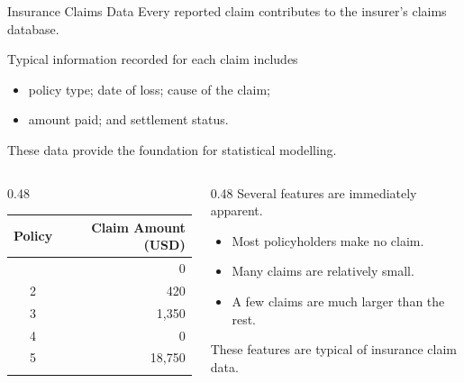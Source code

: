 \documentclass[
  ignorenonframetext,
  aspectratio=169,
]{beamer}
\newcounter{none} %
\providecommand{\tightlist}{%
  \setlength{\itemsep}{0pt}\setlength{\parskip}{0pt}}
\begin{document}
\begin{frame}{Insurance Claims Data}
\protect{}\label{insurance-claims-data}
Every reported claim contributes to the insurer's claims database.

Typical information recorded for each claim includes

\begin{itemize}
\tightlist
\item
  policy type; date of loss; cause of the claim;
\item
  amount paid; and settlement status.
\end{itemize}

These data provide the foundation for statistical modelling.

\begin{columns}[T]
\begin{column}{0.48\linewidth}
{\def\LTcaptype{none} %
\begin{longtable}[]{@{}cr@{}}
\toprule\noalign{}
Policy & Claim Amount (USD) \\
\midrule\noalign{}
\endhead
1 & 0 \\
2 & 420 \\
3 & 1,350 \\
4 & 0 \\
5 & 18,750 \\
\bottomrule\noalign{}
\end{longtable}
}
\end{column}

\begin{column}{0.48\linewidth}
Several features are immediately apparent.

\begin{itemize}
\tightlist
\item
  Most policyholders make no claim.
\item
  Many claims are relatively small.
\item
  A few claims are much larger than the rest.
\end{itemize}

These features are typical of insurance claim data.
\end{column}
\end{columns}
\end{frame}
\end{document}
